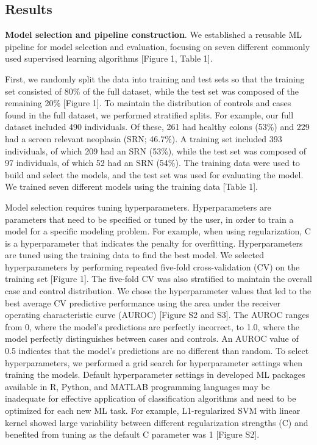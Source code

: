 \documentclass[11pt,]{article}
\begin{document}
\subsection{Results}\label{results}

\textbf{Model selection and pipeline construction}. We established a
reusable ML pipeline for model selection and evaluation, focusing on
seven different commonly used supervised learning algorithms {[}Figure
1, Table 1{]}.

First, we randomly split the data into training and test sets so that
the training set consisted of 80\% of the full dataset, while the test
set was composed of the remaining 20\% {[}Figure 1{]}. To maintain the
distribution of controls and cases found in the full dataset, we
performed stratified splits. For example, our full dataset included 490
individuals. Of these, 261 had healthy colons (53\%) and 229 had a
screen relevant neoplasia (SRN; 46.7\%). A training set included 393
individuals, of which 209 had an SRN (53\%), while the test set was
composed of 97 individuals, of which 52 had an SRN (54\%). The training
data were used to build and select the models, and the test set was used
for evaluating the model. We trained seven different models using the
training data {[}Table 1{]}.

Model selection requires tuning hyperparameters. Hyperparameters are
parameters that need to be specified or tuned by the user, in order to
train a model for a specific modeling problem. For example, when using
regularization, C is a hyperparameter that indicates the penalty for
overfitting. Hyperparameters are tuned using the training data to find
the best model. We selected hyperparameters by performing repeated
five-fold cross-validation (CV) on the training set {[}Figure 1{]}. The
five-fold CV was also stratified to maintain the overall case and
control distribution. We chose the hyperparameter values that led to the
best average CV predictive performance using the area under the receiver
operating characteristic curve (AUROC) {[}Figure S2 and S3{]}. The AUROC
ranges from 0, where the model's predictions are perfectly incorrect, to
1.0, where the model perfectly distinguishes between cases and controls.
An AUROC value of 0.5 indicates that the model's predictions are no
different than random. To select hyperparameters, we performed a grid
search for hyperparameter settings when training the models. Default
hyperparameter settings in developed ML packages available in R, Python,
and MATLAB programming languages may be inadequate for effective
application of classification algorithms and need to be optimized for
each new ML task. For example, L1-regularized SVM with linear kernel
showed large variability between different regularization strengths (C)
and benefited from tuning as the default C parameter was 1 {[}Figure
S2{]}.
\end{document}
